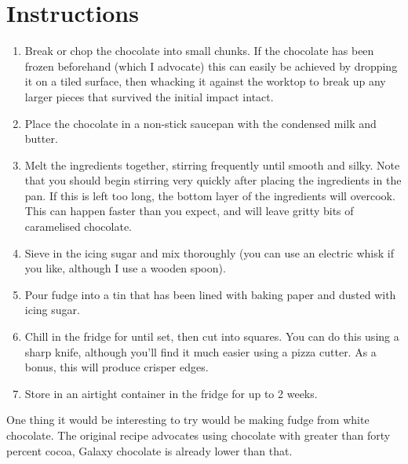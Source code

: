 \documentclass[10pt,a4paper,oneside]{article}
\begin{document}
\section{Instructions}
\begin{enumerate}
\item Break or chop the chocolate into small chunks. If the chocolate has been frozen beforehand (which I advocate) this can easily be achieved by dropping it on a tiled surface, then whacking it against the worktop to break up any larger pieces that survived the initial impact intact.

\item Place the chocolate in a non-stick saucepan with the condensed milk and butter.

\item Melt the ingredients together, stirring frequently until smooth and silky. Note that you should begin stirring very quickly after placing the ingredients in the pan. If this is left too long, the bottom layer of the ingredients will overcook. This can happen faster than you expect, and will leave gritty bits of caramelised chocolate.

\item Sieve in the icing sugar and mix thoroughly (you can use an electric whisk if you like, although I use a wooden spoon).

\item Pour fudge into a tin that has been lined with baking paper and dusted with icing sugar.

\item Chill in the fridge for until set, then cut into squares. You can do this using a sharp knife, although you'll find it much easier using a pizza cutter. As a bonus, this will produce crisper edges.

\item Store in an airtight container in the fridge for up to 2 weeks.
\end{enumerate}

One thing it would be interesting to try would be making fudge from white chocolate. The original recipe advocates using chocolate with greater than forty percent cocoa, Galaxy chocolate is already lower than that.
\end{document}
